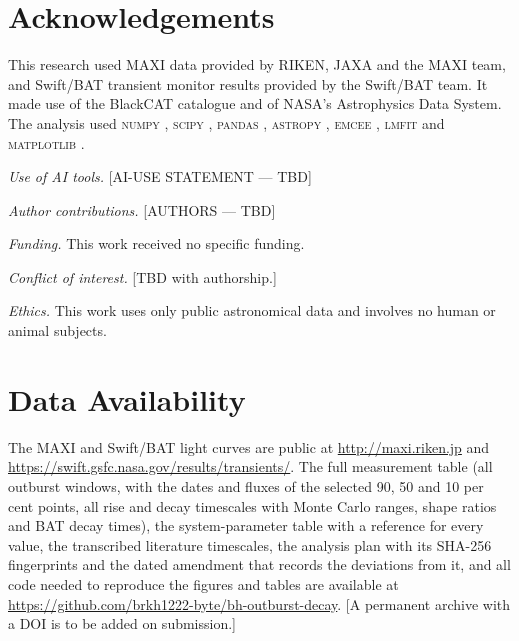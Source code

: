 \documentclass[fleqn,usenatbib]{mnras}
\begin{document}
\section*{Acknowledgements}

This research used MAXI data provided by RIKEN, JAXA and the MAXI team, and Swift/BAT transient monitor results provided by the Swift/BAT team. It made use of the BlackCAT catalogue and of NASA's Astrophysics Data System. The analysis used \textsc{numpy} \citep{Harris2020}, \textsc{scipy} \citep{Virtanen2020}, \textsc{pandas} \citep{McKinney2010}, \textsc{astropy} \citep{Astropy2022}, \textsc{emcee} \citep{ForemanMackey2013}, \textsc{lmfit} \citep{Newville2014} and \textsc{matplotlib} \citep{Hunter2007}.

\textit{Use of AI tools.} [AI-USE STATEMENT --- TBD] %

\textit{Author contributions.} [AUTHORS --- TBD]

\textit{Funding.} This work received no specific funding.

\textit{Conflict of interest.} [TBD with authorship.]

\textit{Ethics.} This work uses only public astronomical data and involves no human or animal subjects.

\section*{Data Availability}

The MAXI and Swift/BAT light curves are public at \url{http://maxi.riken.jp} and \url{https://swift.gsfc.nasa.gov/results/transients/}. The full measurement table (all outburst windows, with the dates and fluxes of the selected 90, 50 and 10 per cent points, all rise and decay timescales with Monte Carlo ranges, shape ratios and BAT decay times), the system-parameter table with a reference for every value, the transcribed literature timescales, the analysis plan with its SHA-256 fingerprints and the dated amendment that records the deviations from it, and all code needed to reproduce the figures and tables are available at \url{https://github.com/brkh1222-byte/bh-outburst-decay}. [A permanent archive with a DOI is to be added on submission.]




\bsp
\label{lastpage}
\end{document}
